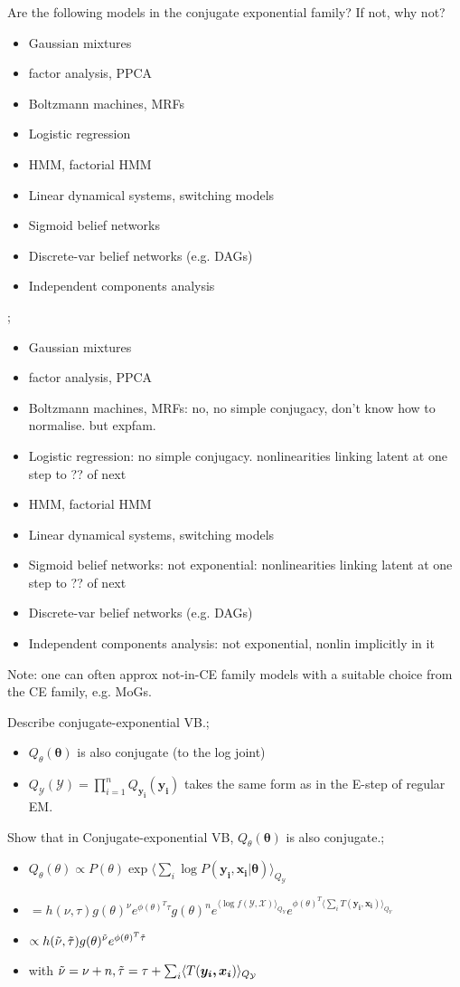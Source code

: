 \documentclass{article}
\begin{document}
Are the following models in the conjugate exponential family? If not, why not?  \begin{itemize} \item Gaussian mixtures \item factor analysis, PPCA \item Boltzmann machines, MRFs \item Logistic regression \item HMM, factorial HMM \item Linear dynamical systems, switching models \item Sigmoid belief networks \item Discrete-var belief networks (e.g. DAGs) \item Independent components analysis \end{itemize}; \begin{itemize} \item Gaussian mixtures \item factor analysis, PPCA \item Boltzmann machines, MRFs: no, no simple conjugacy, don't know how to normalise. but expfam.  \item Logistic regression: no simple conjugacy. nonlinearities linking latent at one step to ?? of next \item HMM, factorial HMM \item Linear dynamical systems, switching models \item Sigmoid belief networks: not exponential: nonlinearities linking latent at one step to ?? of next \item Discrete-var belief networks (e.g. DAGs) \item Independent components analysis: not exponential, nonlin implicitly in it \end{itemize} Note: one can often approx not-in-CE family models with a suitable choice from the CE family, e.g. MoGs.

Describe conjugate-exponential VB.; \begin{itemize} \item $Q_\theta(\bm{\theta})$ is also conjugate (to the log joint) \item $Q_\mathcal{Y}(\mathcal{Y}) = \prod_{i=1}^n Q_{\bm{y_i}}(\bm{y_i})$ takes the same form as in the E-step of regular EM.  \end{itemize}

Show that in Conjugate-exponential VB, $Q_\theta(\bm{\theta})$ is also conjugate.; \begin{itemize} \item $Q_{\theta}(\theta)\propto P(\theta)\exp \langle \sum_i \log P(\bm{y_i, x_i|\theta})\rangle_{Q_\mathcal{Y}}$ \item $=h(\nu, \tau)g(\theta)^\nu e^{\phi(\theta)^T\tau} g(\theta)^n e^{\langle \log f(\mathcal{Y,X})\rangle_{Q_Y}}e^{\phi(\theta)^T\langle \sum_i T(\bm{y_i, x_i})\rangle_{Q_Y}}$ \item $\propto h(\Tilde{\nu}, \Tilde{\tau})g(\theta)^{\Tilde{\nu}}e^{\phi(\theta)^T\Tilde{\tau}}$ \item with $\Tilde{\nu} = \nu + n, \Tilde{\tau} = \tau + \sum_i \langle T(\bm{y_i, x_i})\rangle_{Q_{\mathcal{Y}}}$ \end{itemize}
\end{document}
